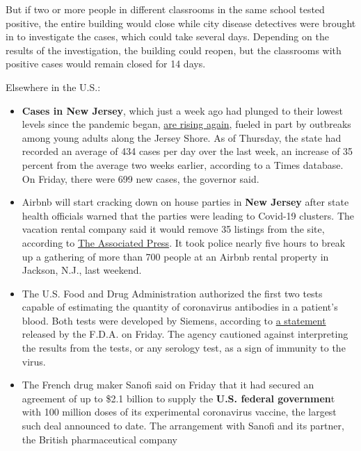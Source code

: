 But if two or more people in different classrooms in the same school
tested positive, the entire building would close while city disease
detectives were brought in to investigate the cases, which could take
several days. Depending on the results of the investigation, the
building could reopen, but the classrooms with positive cases would
remain closed for 14 days.

Elsewhere in the U.S.:

\begin{itemize}
\item
  \textbf{Cases in New Jersey}, which just a week ago had plunged to
  their lowest levels since the pandemic began,
  \href{https://www.nytimes3xbfgragh.onion/2020/07/30/nyregion/coronavirus-cases-nj.html}{are
  rising again}, fueled in part by outbreaks among young adults along
  the Jersey Shore. As of Thursday, the state had recorded an average of
  434 cases per day over the last week, an increase of 35 percent from
  the average two weeks earlier, according to a Times database. On
  Friday, there were 699 new cases, the governor said.
\item
  Airbnb will start cracking down on house parties in \textbf{New
  Jersey} after state health officials warned that the parties were
  leading to Covid-19 clusters. The vacation rental company said it
  would remove 35 listings from the site, according to
  \href{https://apnews.com/c64053bb7f7b60001a314526da06732e}{The
  Associated Press}. It took police nearly five hours to break up a
  gathering of more than 700 people at an Airbnb rental property in
  Jackson, N.J., last weekend.
\item
  The U.S. Food and Drug Administration authorized the first two tests
  capable of estimating the quantity of coronavirus antibodies in a
  patient's blood. Both tests were developed by Siemens, according to
  \href{https://www.fda.gov/news-events/press-announcements/coronavirus-covid-19-update-fda-authorizes-first-tests-estimate-patients-antibodies-past-sars-cov-2}{a
  statement} released by the F.D.A. on Friday. The agency cautioned
  against interpreting the results from the tests, or any serology test,
  as a sign of immunity to the virus.
\item
  The French drug maker Sanofi said on Friday that it had secured an
  agreement of up to \$2.1 billion to supply the \textbf{U.S. federal
  governmen}t with 100 million doses of its experimental coronavirus
  vaccine, the largest such deal announced to date. The arrangement with
  Sanofi and its partner, the British pharmaceutical company

\end{itemize}
